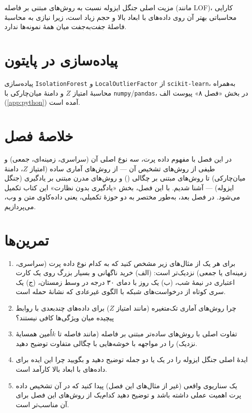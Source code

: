 مزیت اصلی جنگل ایزوله نسبت به روش‌های مبتنی بر فاصله (مانند LOF)، کارایی
محاسباتی بهتر آن روی داده‌های با ابعاد بالا و حجم زیاد است، زیرا نیازی
به محاسبهٔ فاصلهٔ جفت‌به‌جفت میان همهٔ نمونه‌ها ندارد.

\section*{پیاده‌سازی در پایتون}

پیاده‌سازی \texttt{IsolationForest} و \texttt{LocalOutlierFactor} از
\texttt{scikit-learn}، به‌همراه محاسبهٔ امتیاز $Z$ و دامنهٔ میان‌چارکی
با \texttt{numpy}/\texttt{pandas}، در بخش «فصل ۸» پیوست الف
(\ref{app:python}) آمده است.

\section*{خلاصهٔ فصل}

در این فصل با مفهوم داده پرت، سه نوع اصلی آن (سراسری، زمینه‌ای، جمعی)
و طیفی از روش‌های تشخیص آن — از روش‌های آماری ساده (امتیاز $Z$، دامنهٔ
میان‌چارکی) تا روش‌های مبتنی بر چگالی () و روش‌های مدرن مبتنی
بر یادگیری (جنگل ایزوله) — آشنا شدیم. با این فصل، بخش «یادگیری بدون
نظارت» این کتاب تکمیل می‌شود. در فصل بعد، به‌طور مختصر به دو حوزهٔ
تکمیلی، یعنی داده‌کاوی متن و وب، می‌پردازیم.

\section*{تمرین‌ها}

\begin{enumerate}
    \item برای هر یک از مثال‌های زیر مشخص کنید که به کدام نوع داده پرت
          (سراسری، زمینه‌ای یا جمعی) نزدیک‌تر است: (الف) خرید ناگهانی
          و بسیار بزرگ روی یک کارت اعتباری در نیمهٔ شب، (ب) یک روز با
          دمای ۳۰ درجه در وسط زمستان، (ج) یک سری کوتاه از درخواست‌های
          شبکه با الگوی غیرعادی که نشانهٔ حمله است.
    \item چرا روش‌های آماری تک‌متغیره (مانند امتیاز $Z$) برای داده‌های
          چندبعدی با روابط پیچیده میان ویژگی‌ها کافی نیستند؟
    \item تفاوت اصلی  با روش‌های ساده‌تر مبتنی بر فاصله (مانند
          فاصله تا $k$اُمین همسایهٔ نزدیک) را در مواجهه با خوشه‌هایی با
          چگالی متفاوت توضیح دهید.
    \item ایدهٔ اصلی جنگل ایزوله را در یک یا دو جمله توضیح دهید و بگویید
          چرا این ایده برای داده‌های با ابعاد بالا کارآمد است.
    \item یک سناریوی واقعی (غیر از مثال‌های این فصل) پیدا کنید که در آن
          تشخیص داده پرت اهمیت عملی داشته باشد و توضیح دهید کدام‌یک از
          روش‌های این فصل برای آن مناسب‌تر است.
\end{enumerate}
